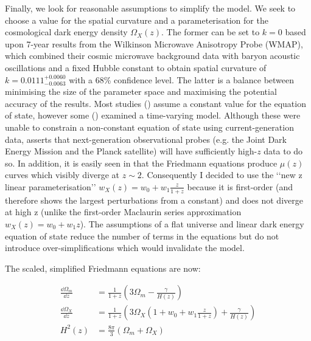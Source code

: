 Finally, we look for reasonable assumptions to simplify the model. 
We seek to choose a value for the spatial curvature and a parameterisation for the cosmological dark energy density $\Omega_X (z)$. 
The former can be set to $k = 0$ based upon 7-year results \cite{Komatsu2010} from the Wilkinson Microwave Anisotropy Probe (WMAP), which combined their cosmic microwave background data with baryon acoustic oscillations and a fixed Hubble constant to obtain spatial curvature of $k = 0.0111^{+0.0060}_{-0.0063}$ with a 68\% confidence level. 
The latter is a balance between minimising the size of the parameter space and maximising the potential accuracy of the results. Most studies (\cite{Riess2007,LewisBridle2002,Kowalski2008,Komatsu2010}) assume a constant value for the equation of state, however some (\cite{Hicken2009,Barnes2005}) examined a time-varying model. Although these were unable to constrain a non-constant equation of state using current-generation data, \cite{Barnes2005} asserts that next-generation observational probes (e.g. the Joint Dark Energy Mission and the Planck satellite) will have sufficiently high-$z$ data to do so. 
In addition, it is easily seen in \cite{Linder1988a} that the Friedmann equations produce $\mu(z)$ curves which visibly diverge at $z \sim 2$. Consequently I decided to use the \lq\lq{}new z linear parameterisation\rq\rq{} $w_X (z) = w_0 + w_1 \frac{z}{1+z}$ \cite{Barnes2005,Komatsu2010} because it is first-order (and therefore shows the largest perturbations from a constant) and does not diverge at high z (unlike the first-order Maclaurin series approximation $w_X (z) = w_0 + w_1 z$). The assumptions of a flat universe and linear dark energy equation of state reduce the number of terms in the equations but do not introduce over-simplifications which would invalidate the model. 

The scaled, simplified Friedmann equations are now:

\begin{subequations}
\label{eq:2.7}
\begin{align}
    \frac{\dd{\Omega_{m}}}{\dd{z}}
    &= \frac{1}{1+z} \left(
        3 \Omega_{m} - \frac{\gamma{}}{H(z)}
    \right)
\label{eq:2.7a} \\
    \frac{\dd{\Omega_{X}}}{\dd{z}}
    &= \frac{1}{1+z} \left(
        3 \Omega_{X} \left( 1 + w_{0} + w_{1} \frac{z}{1+z} \right)
        + \frac{\gamma{}}{H(z)}
    \right)
\label{eq:2.7b} \\
    H^{2}(z)
    &= \frac{8\pi{}}{3} \left( \Omega_{m} + \Omega_{X} \right)
\label{eq:2.7c}
\end{align}
\end{subequations}

